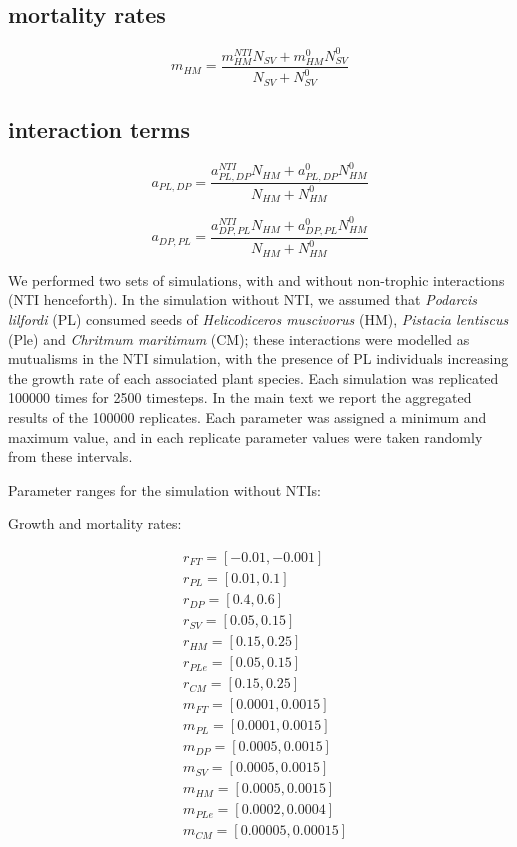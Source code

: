 \subsection*{mortality rates}

\begin{equation}
m_{HM} = \frac{m_{HM}^{NTI}N_{SV} + m_{HM}^{0}N_{SV}^{0}}{N_{SV} + N_{SV}^0}
\end{equation}

\subsection*{interaction terms}

\begin{equation}
a_{PL,DP} = \frac{a_{PL,DP}^{NTI}N_{HM} + a_{PL,DP}^{0}N_{HM}^{0}}{N_{HM} + N_{HM}^0}
\end{equation}

\begin{equation}
a_{DP,PL} = \frac{a_{DP,PL}^{NTI}N_{HM} + a_{DP,PL}^{0}N_{HM}^{0}}{N_{HM} + N_{HM}^0}
\end{equation}

We performed two sets of simulations, with and without non-trophic interactions (NTI henceforth). In the simulation without NTI, we assumed that \textit{Podarcis lilfordi} (PL) consumed seeds of \textit{Helicodiceros muscivorus} (HM), \textit{Pistacia lentiscus} (Ple) and \textit{Chritmum maritimum} (CM); these interactions were modelled as mutualisms in the NTI simulation, with the presence of PL individuals increasing the growth rate of each associated plant species. Each simulation was replicated 100000 times for 2500 timesteps. In the main text we report the aggregated results of the 100000 replicates. Each parameter was assigned a minimum and maximum value, and in each replicate parameter values were taken randomly from these intervals.

Parameter ranges for the simulation without NTIs:

Growth and mortality rates:

\begin{align*}
& r_{FT} = [-0.01,-0.001] \\
& r_{PL} = [0.01,0.1] \\
& r_{DP} = [0.4,0.6] \\
& r_{SV} = [0.05,0.15] \\
& r_{HM} = [0.15,0.25] \\
& r_{PLe} = [0.05,0.15] \\
& r_{CM} = [0.15,0.25] \\
& m_{FT} = [0.0001,0.0015] \\
& m_{PL} = [0.0001,0.0015] \\
& m_{DP} = [0.0005,0.0015] \\
& m_{SV} = [0.0005,0.0015] \\
& m_{HM} = [0.0005,0.0015] \\
& m_{PLe} = [0.0002,0.0004] \\
& m_{CM} = [0.00005,0.00015] \\
\end{align*}

